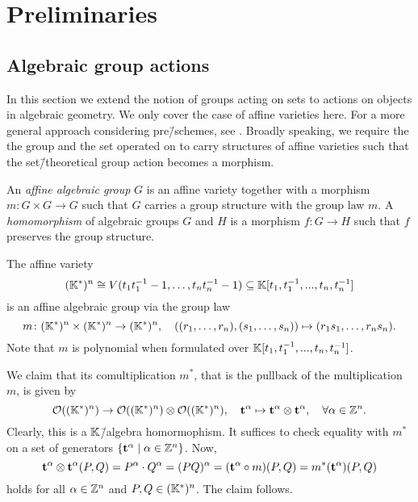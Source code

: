 \chapter{Preliminaries}



\section{Algebraic group actions}

In this section we extend the notion of groups acting on sets to actions on objects in algebraic geometry. We only cover the case of affine varieties here. For a more general approach considering pre\=/schemes, see \cite{git}. Broadly speaking, we require the the group and the set operated on to carry structures of affine varieties such that the set\=/theoretical group action becomes a morphism.

\begin{defi}
	An \emph{affine algebraic group} $G$ is an affine variety together with a morphism $m\colon G \times G \rightarrow G$ such that $G$ carries a group structure with the group law $m$. A \emph{homomorphism} of algebraic groups $G$ and $H$ is a morphism $f\colon G \rightarrow H$ such that $f$ preserves the group structure.
\end{defi}

\begin{ex}
	\label{example:algebraic_torus}
	The affine variety $$(\mathbb{K}^*)^n \cong V(t_1t_1^{-1} - 1,\dots, t_nt_n^{-1}-1)\subseteq\mathbb{K}[t_1,t_1^{-1},...,t_n,t_n^{-1}]$$
	is an affine algebraic group via the group law
	$$m\colon (\mathbb{K}^*)^n \times (\mathbb{K}^*)^n \rightarrow (\mathbb{K}^*)^n,\quad ((r_1,\dots,r_n),(s_1,\dots,s_n)) \mapsto (r_1s_1,\dots,r_ns_n).$$
	Note that $m$ is polynomial when formulated over $\mathbb{K}[t_1,t_1^{-1},...,t_n,t_n^{-1}]$.
	
	We claim that its comultiplication $m^*$, that is the pullback of the multiplication $m$, is given by
	$$\mathcal{O}((\mathbb{K}^*)^n) \rightarrow \mathcal{O}((\mathbb{K}^*)^n) \otimes \mathcal{O}((\mathbb{K}^*)^n),\quad \mathbf{t}^\alpha \mapsto \mathbf{t}^\alpha \otimes \mathbf{t}^\alpha,\quad \forall \alpha\in\mathbb{Z}^n.$$
	Clearly, this is a $\mathbb{K}$\=/algebra homormophism. It suffices to check equality with $m^*$ on a set of generators $\{\mathbf{t}^\alpha\mid \alpha\in\mathbb{Z}^n\}$. Now, 
	$$\mathbf{t}^\alpha \otimes \mathbf{t}^\alpha (P, Q) = P^\alpha\cdot Q^\alpha = (PQ)^\alpha =  (\mathbf{t}^\alpha \circ m) (P,Q) = m^*(\mathbf{t}^\alpha) (P,Q)$$ holds for all $\alpha\in\mathbb{Z}^n$ and $P,Q\in(\mathbb{K}^*)^n$. The claim follows.
\end{ex}

